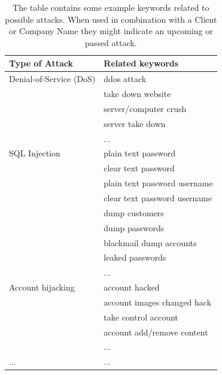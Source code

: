 \documentclass[12pt]{article}
\begin{document}
\begin {table}[h!]
\label{tab:title} 
\begin{center} 
\begin{longtable}{|l | l|}
\hline
Type of Attack & Related keywords \\ 
\hline
 Denial-of-Service (DoS) & ddos attack \\ 
 						& take down website \\ 
 						&  server/computer crush  \\
 						& server take down \\
 						& ... \\

\hline
SQL Injection 	& plain text password\\
				& clear text password \\
				& plain text password username \\
				& clear text password username\\
				& dump customers \\
				& dump passwords \\
				& blackmail dump accounts \\
				& leaked passwords \\
				& ... \\
				
\hline
Account hijacking & account hacked \\
				  & account images changed hack \\
				  & take control account \\
				  & account add/remove content \\ 
				  & ... \\	
\hline
... & ...\\		  
\hline
\end{longtable}
\caption {The table contains some example keywords related to possible attacks. When used in combination with a Client or Company Name they might indicate an upcoming or passed attack.}
\end{center} 
\end {table}
\newpage
\end{document}
